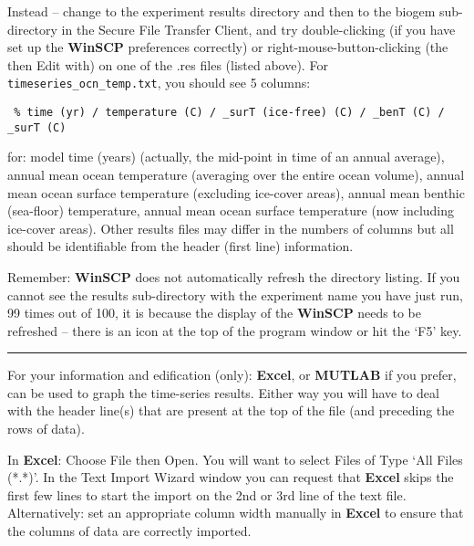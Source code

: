 Instead – change to the experiment results directory and then to the \textsf{\footnotesize biogem} sub-directory in the Secure File Transfer Client, and try double-clicking (if you have set up the \textbf{WinSCP} preferences correctly) or right-mouse-button-clicking (the then Edit with) on one of the .res files (listed above).
\vspace{1mm}
For \texttt{timeseries\_ocn\_temp.txt}, you should see 5 columns:
\small\begin{verbatim}
 % time (yr) / temperature (C) / _surT (ice-free) (C) / _benT (C) / _surT (C)
\end{verbatim}\normalsize
for: model time (years) (actually, the mid-point in time of an annual average), annual mean ocean temperature (averaging over the entire ocean volume), annual mean ocean surface temperature (excluding ice-cover areas), annual mean benthic (sea-floor) temperature, annual mean ocean surface temperature (now including ice-cover areas). Other results files may differ in the numbers of columns but all should be identifiable from the header (first line) information.

Remember: \textbf{WinSCP} does not automatically refresh the directory listing. If you cannot see the results sub-directory with the experiment name you have just run, 99 times out of 100, it is because the display of the \textbf{WinSCP} needs to be refreshed -- there is an icon at the top of the program window or hit the ‘\textsf{\footnotesize F5}’ key.

\vspace{1mm}
\noindent\rule{4cm}{0.1mm}
\vspace{2mm}

\noindent For your information and edification (only): \textbf{Excel}, or \textbf{MUTLAB} if you prefer, can be used to graph the time-series results. Either way you will have to deal with the header line(s) that are present at the top of the file (and preceding the rows of data).

In \textbf{Excel}: Choose \textsf{\footnotesize File} then \textsf{\footnotesize Open}.  You will want to select \textsf{\footnotesize Files of Type} ‘\textsf{\footnotesize All Files (*.*)}’. In the \textsf{\footnotesize Text Import Wizard} window you can request that \textbf{Excel} skips the first few lines to start the import on the 2nd or 3rd line of the text file. Alternatively: set an appropriate column width manually in \textbf{Excel} to ensure that the columns of data are correctly imported.

